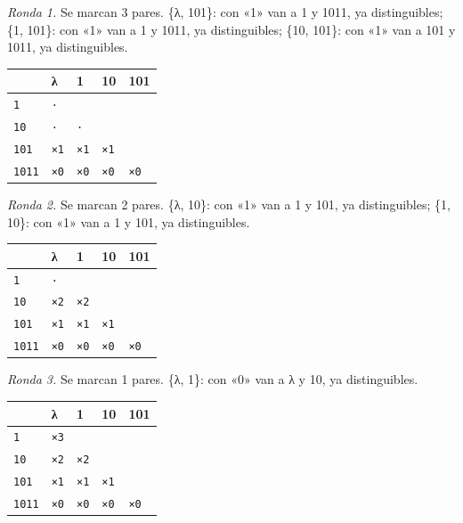 \documentclass[11pt]{article}
\begin{document}
\textit{Ronda 1.} Se marcan 3 pares. \{λ, 101\}: con «1» van a 1 y 1011, ya distinguibles; \{1, 101\}: con «1» van a 1 y 1011, ya distinguibles; \{10, 101\}: con «1» van a 101 y 1011, ya distinguibles.
\begin{center}\footnotesize\begin{tabular}{lllll}\toprule
 & λ & 1 & 10 & 101 \\\midrule
\texttt{1} & \texttt{·} & \texttt{} & \texttt{} & \texttt{} \\
\texttt{10} & \texttt{·} & \texttt{·} & \texttt{} & \texttt{} \\
\texttt{101} & \texttt{×1} & \texttt{×1} & \texttt{×1} & \texttt{} \\
\texttt{1011} & \texttt{×0} & \texttt{×0} & \texttt{×0} & \texttt{×0} \\
\bottomrule\end{tabular}\end{center}
\textit{Ronda 2.} Se marcan 2 pares. \{λ, 10\}: con «1» van a 1 y 101, ya distinguibles; \{1, 10\}: con «1» van a 1 y 101, ya distinguibles.
\begin{center}\footnotesize\begin{tabular}{lllll}\toprule
 & λ & 1 & 10 & 101 \\\midrule
\texttt{1} & \texttt{·} & \texttt{} & \texttt{} & \texttt{} \\
\texttt{10} & \texttt{×2} & \texttt{×2} & \texttt{} & \texttt{} \\
\texttt{101} & \texttt{×1} & \texttt{×1} & \texttt{×1} & \texttt{} \\
\texttt{1011} & \texttt{×0} & \texttt{×0} & \texttt{×0} & \texttt{×0} \\
\bottomrule\end{tabular}\end{center}
\textit{Ronda 3.} Se marcan 1 pares. \{λ, 1\}: con «0» van a λ y 10, ya distinguibles.
\begin{center}\footnotesize\begin{tabular}{lllll}\toprule
 & λ & 1 & 10 & 101 \\\midrule
\texttt{1} & \texttt{×3} & \texttt{} & \texttt{} & \texttt{} \\
\texttt{10} & \texttt{×2} & \texttt{×2} & \texttt{} & \texttt{} \\
\texttt{101} & \texttt{×1} & \texttt{×1} & \texttt{×1} & \texttt{} \\
\texttt{1011} & \texttt{×0} & \texttt{×0} & \texttt{×0} & \texttt{×0} \\
\bottomrule\end{tabular}\end{center}
\end{document}

